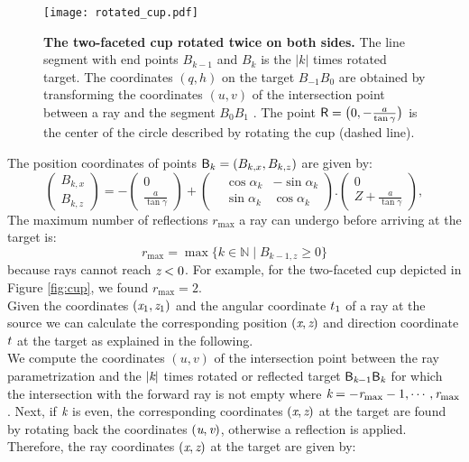\begin{figure}[t]%
 \centering
  \texttt{[image: rotated\_cup.pdf]}
 \caption{\textbf{The two-faceted cup rotated twice on both sides.} The line segment with end points $B_{k-1}$ and $B_{k}$ is the $|k|$ times rotated target. The coordinates $(q,h)$ on the target $B_{-1}B_{0}$ are obtained by transforming the coordinates $(u,v)$ of the intersection point between a ray and the segment $B_0B_1$ . The point $\textsf{R} = \big(0,-\frac{a}{\tan{\gamma}}\big)$ is the center of the circle described by rotating the cup (dashed line).}
  \label{fig:twofaced}
  \end{figure}
The position coordinates of points $\textsf{B}_k = (B_{k,x}, B_{k,z})$ are given by:
\begin{equation}
 \begin{pmatrix} B_{k,x}  \\  B_{k,z}\end{pmatrix}= -
  \begin{pmatrix} 0  \\  \frac{a}{\tan\gamma}\end{pmatrix}+
 \left(\begin{split}  & \cos\alpha_k  & -\sin\alpha_k \\  & \sin\alpha_k & \cos\alpha_k\end{split}\right).
 \begin{pmatrix}  0 \\  Z+\frac{a}{\tan\gamma}\end{pmatrix},
\end{equation}
The maximum number of reflections $r_{\textrm{max}}$ a ray can undergo before arriving at the target is:
\begin{equation}
r_{\textrm{max}}=\max\{k\in\mathbb{N} \;| \; B_{k-1,z}\geq 0\}
\end{equation}
because rays cannot reach $\textit{z}<0$.
For example, for the two-faceted cup depicted in Figure \ref{fig:cup}, we found $r_{\textrm{max}}=2$.\\ \indent 
Given the coordinates $(\textit{x}_1, \textit{z}_1)$ and the angular coordinate $t_1$ of a ray at the source we can calculate the corresponding position $(\textit{x}, \textit{z})$ and direction coordinate $t$ at the target as explained in the following. \\ \indent We compute the coordinates $(u,v)$ of the intersection point between the ray parametrization and the $|\textit{k}|$ times rotated or reflected target $\textsf{B}_{\textit{k}-1}\textsf{B}_{\textit{k}}$ for which the intersection with the forward ray is not empty where $\textit{k}=-\textit{r}_{\textrm{max}}-1, \cdots, \textit{r}_{\textrm{max}}$. Next, if $\textit{k}$ is even, the corresponding coordinates $(\textit{x},\textit{z})$ at the target are found by rotating back the coordinates $(\textit{u},\textit{v})$, otherwise a reflection is applied. Therefore, the ray coordinates $(\textit{x},\textit{z})$ at the target are given by:
